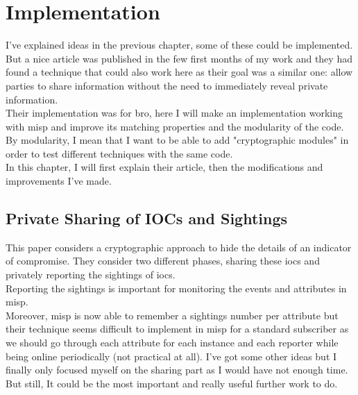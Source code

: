 \documentclass{eplmastersthesis}
\begin{document}
\chapter{Implementation}
I've explained ideas in the previous chapter, some of these could be implemented. But a nice article \cite{van2016private} was published in the few first months of my work and they had found a technique that could also work here as their goal was a similar one: allow parties to share information without the need to immediately reveal private information.\\
Their implementation was for bro, here I will make an implementation working with \gls{misp} and improve its matching properties and the modularity of the code. \\
By modularity, I mean that I want to be able to add "cryptographic modules" in order to test different techniques with the same code.\\
In this chapter, I will first explain their article, then the modifications and improvements I've made.\\

\section{Private Sharing of IOCs and Sightings \cite{van2016private}}
\label{sec:articlePrivate}
This paper considers a cryptographic approach to hide the details of an indicator of compromise. They consider two different phases, sharing these \gls{ioc}s and privately reporting the sightings of \gls{ioc}s.\\

Reporting the sightings is important for monitoring the events and attributes in \gls{misp}.\\ 
Moreover, \gls{misp} is now able to remember a sightings number per attribute but their technique seems difficult to implement in \gls{misp} for a standard subscriber as we should go through each attribute for each instance and each reporter while being online periodically (not practical at all). I've got some other ideas but I finally only focused myself on the sharing part as I would have not enough time.\\ 
But still, It could be the most important and really useful further work to do.\\
\end{document}
